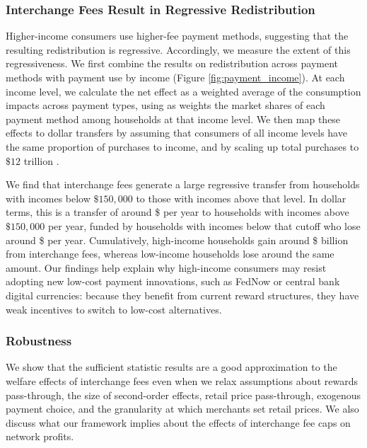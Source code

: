 \documentclass[main.tex]{subfiles}
\begin{document}
\subsubsection{Interchange Fees Result in Regressive Redistribution}

Higher-income consumers use higher-fee payment methods, suggesting that the resulting redistribution is regressive.
Accordingly, we measure the extent of this regressiveness.
We first combine the results on redistribution across payment methods with payment use by income (Figure \ref{fig:payment_income}).
At each income level, we calculate the net effect as a weighted average of the consumption impacts across payment types, using as weights the market shares of each payment method among households at that income level.
We then map these effects to dollar transfers by assuming that consumers of all income levels have the same proportion of purchases to income, and by scaling up total purchases to $\$12$ trillion \citep{Nilson2023a}.

We find that interchange fees generate a large regressive transfer from households with incomes below $\$150,000$ to those with incomes above that level.
In dollar terms, this is a transfer of around \$ per year to households with incomes above $\$150,000$ per year, funded by households with incomes below that cutoff who lose around \$ per year.
Cumulatively, high-income households gain around \$ billion from interchange fees, whereas low-income households lose around the same amount.
Our findings help explain why high-income consumers may resist adopting new low-cost payment innovations, such as FedNow or central bank digital currencies: because they benefit from current reward structures, they have weak incentives to switch to low-cost alternatives.

\subsubsection{Robustness}
\label{subsubsec:robustness}

We show that the sufficient statistic results are a good approximation to the welfare effects of interchange fees even when we relax assumptions about rewards pass-through, the size of second-order effects, retail price pass-through, exogenous payment choice, and the granularity at which merchants set retail prices. We also discuss what our framework implies about the effects of interchange fee caps on network profits.
\end{document}
